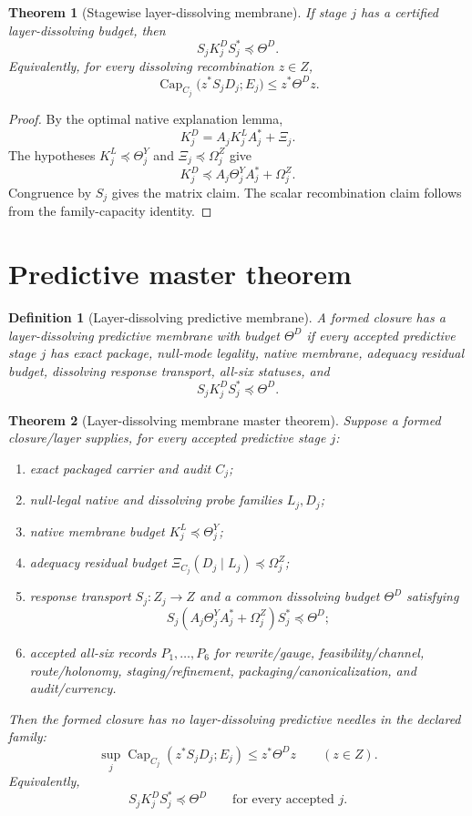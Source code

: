 \documentclass[11pt]{article}
\newtheorem{theorem}{Theorem}
\newtheorem{definition}{Definition}
\providecommand{\Cap}{\operatorname{Cap}}
\begin{document}
\begin{theorem}[Stagewise layer-dissolving membrane]
If stage $j$ has a certified layer-dissolving budget, then
\[
 S_jK^D_jS_j^*\preceq \Theta^D.
\]
Equivalently, for every dissolving recombination $z\in Z$,
\[
 \Cap_{C_j}\bigl(z^*S_jD_j;E_j\bigr)\le z^*\Theta^Dz.
\]
\end{theorem}

\begin{proof}
By the optimal native explanation lemma,
\[
 K^D_j=A_jK^L_jA_j^*+\Xi_j.
\]
The hypotheses $K^L_j\preceq\Theta^Y_j$ and $\Xi_j\preceq\Omega^Z_j$ give
\[
 K^D_j\preceq A_j\Theta^Y_jA_j^*+\Omega^Z_j.
\]
Congruence by $S_j$ gives the matrix claim.  The scalar recombination claim follows from the family-capacity identity.
\end{proof}

\section{Predictive master theorem}
\begin{definition}[Layer-dissolving predictive membrane]
A formed closure has a layer-dissolving predictive membrane with budget $\Theta^D$ if every accepted predictive stage $j$ has exact package, null-mode legality, native membrane, adequacy residual budget, dissolving response transport, all-six statuses, and
\[
 S_jK^D_jS_j^*\preceq\Theta^D.
\]
\end{definition}

\begin{theorem}[Layer-dissolving membrane master theorem]
Suppose a formed closure/layer supplies, for every accepted predictive stage $j$:
\begin{enumerate}[label=(\alph*)]
\item exact packaged carrier and audit $C_j$;
\item null-legal native and dissolving probe families $L_j,D_j$;
\item native membrane budget $K^L_j\preceq\Theta^Y_j$;
\item adequacy residual budget $\Xi_{C_j}(D_j\mid L_j)\preceq\Omega^Z_j$;
\item response transport $S_j:Z_j\to Z$ and a common dissolving budget $\Theta^D$ satisfying
\[
 S_j(A_j\Theta^Y_jA_j^*+\Omega^Z_j)S_j^*\preceq\Theta^D;
\]
\item accepted all-six records $P_1,\dots,P_6$ for rewrite/gauge, feasibility/channel, route/holonomy, staging/refinement, packaging/canonicalization, and audit/currency.
\end{enumerate}
Then the formed closure has no layer-dissolving predictive needles in the declared family:
\[
 \sup_j \Cap_{C_j}(z^*S_jD_j;E_j)\le z^*\Theta^Dz
 \qquad(z\in Z).
\]
Equivalently,
\[
 S_jK^D_jS_j^*\preceq\Theta^D
\qquad\text{for every accepted }j.
\]
\end{theorem}
\end{document}
